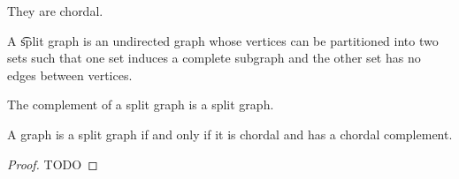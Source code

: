 
\sbasic







































\sstart
{}


They are chordal.


A \t{split graph} is an undirected graph whose vertices can be partitioned into two sets such that one set induces a complete subgraph and the other set has no edges between vertices.


\begin{prop}

  The complement of a split graph is a split graph.

\end{prop}

\begin{prop}

  A graph is a split graph if and only if it is chordal and has a chordal complement.

\begin{proof}

  TODO

\end{proof}

\end{prop}
\strats
